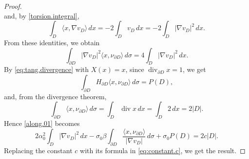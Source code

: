 \documentclass[10pt,reqno,a4paper]{article}
\numberwithin{equation}{section}
\theoremstyle{plain}
\theoremstyle{definition}
\newcommand{\s}{\sigma}
\newcommand{\la}{\langle}
\newcommand{\ra}{\rangle}
\newcommand{\pa}{\partial}
\renewcommand{\div}{\operatorname{div}} %
\newcommand{\grad}{\nabla}
\begin{document}
\begin{proof}
\[\]
and, by \eqref{torsion.integral},
\[
\int_D \la x , \grad v_D \ra \, dx 
= - 2 \int_D v_D \, dx 
= - 2 \int_D |\grad v_D|^2 \, dx.
\]
From these identities, we obtain  
\begin{equation}\label{eq:boundary.interior}
\int_{\pa D}|\nabla v_D|^2\la x,\nu_{\pa D}\ra \, d\sigma 
= 4 \int_{D}|\nabla v_D|^2\,dx.
\end{equation}
By \eqref{eq:tang.divergence} with $X(x)=x$, 
since $\div_{\pa D} x=1$, we get
\[
\int_{\pa D} H_{\pa D} \la x, \nu_{\pa D} \ra \, d\sigma = P(D), 
\]
and, from the divergence theorem, 
\[
\int_{\pa D} \la x, \nu_{\pa D} \ra \, d\sigma 
= \int_D \div x \, dx 
= \int_D 2 \, dx 
= 2 |D|.
\]
Hence \eqref{along.01} becomes 
\[
2 \alpha_0^2 \int_{D}|\nabla v_D|^2\,dx 
- \sigma_0 \beta \int_{\pa D} \frac{\la x, \nu_{\pa D} \ra }{ |\grad v_D| } \, d\sigma 
+ \sigma_0 P(D) = 2 c |D|.
\]
Replacing the constant $c$ with its formula in \eqref{eq:constant.c}, 
we get the result. 
\end{proof}
\end{document}
